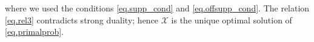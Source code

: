 \documentclass[conference,10pt]{IEEEtran}
\theoremstyle{remark}
\theoremstyle{plain}
\theoremstyle{definition}
\theoremstyle{remark}
\begin{document}
where we used the conditions \eqref{eq.supp_cond} and \eqref{eq.offsupp_cond}. The relation \eqref{eq.rel3} contradicts strong duality; hence $\bm{\mathcal{X}}$ is the unique optimal solution of \eqref{eq.primalprob}.





% 
\end{document}
